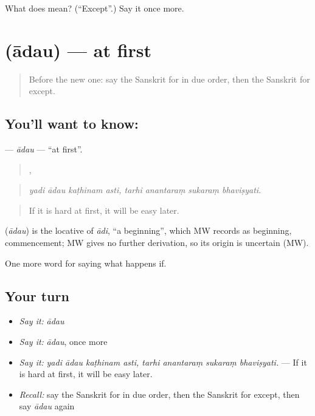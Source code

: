 \begin{tcolorbox}[breakable,colback=teal!4,colframe=teal!35!black,title={Before you move on}]
What does  mean? (\textquotedblleft{}Except\textquotedblright{}.) Say it once more.
\end{tcolorbox}
\section[\texorpdfstring{\sk{आदौ} (ādau)}{आदौ (ādau)}]{ (ādau) — at first}

\label{lesson:SA-C545-adau}



\begin{quote}
Before the new one: say the Sanskrit for in due order, then the Sanskrit for except.
\end{quote}

\subsection*{You'll want to know: }
\textbf{} — \emph{ādau} — \textquotedblleft{}at first\textquotedblright{}.

\begin{quote}
   ,    
\end{quote}

\begin{quote}
\emph{yadi ādau kaṭhinam asti, tarhi anantaraṃ sukaraṃ bhaviṣyati.}
\end{quote}

\begin{quote}
If it is hard at first, it will be easy later.
\end{quote}

\begin{cousinweb}
\textbf{} (\emph{ādau}) is the locative of \emph{ādi}, \textquotedblleft{}a beginning\textquotedblright{}, which MW records as beginning, commencement; MW gives no further derivation, so its origin is uncertain (MW).
\end{cousinweb}

\begin{grammarlens}[title={What you've built}]
One more word for saying what happens if.
\end{grammarlens}

\subsection*{Your turn}
\begin{itemize}
\raggedright
  \item \emph{Say it:} \emph{ādau}
  \item \emph{Say it:} \emph{ādau}, once more
  \item \emph{Say it:} \emph{yadi ādau kaṭhinam asti, tarhi anantaraṃ sukaraṃ bhaviṣyati.} — If it is hard at first, it will be easy later.
  \item \emph{Recall:} say the Sanskrit for in due order, then the Sanskrit for except, then say \emph{ādau} again
\end{itemize}

